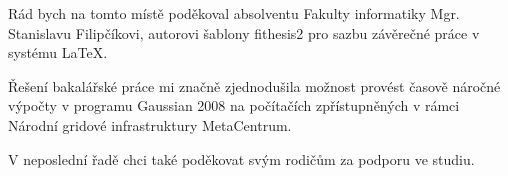 \documentclass[10pt,draft,oneside]{fithesis2}
\begin{document}

\FrontMatter
\ThesisTitlePage

\begin{ThesisDeclaration}
  \DeclarationText
  \AdvisorName
\end{ThesisDeclaration}

\begin{ThesisThanks}
Rád bych na tomto místě poděkoval absolventu Fakulty informatiky Mgr. Stanislavu Filipčíkovi, autorovi šablony fithesis2 pro sazbu závěrečné práce v systému \LaTeX{}.

Řešení bakalářské práce mi značně zjednodušila možnost provést časově náročné výpočty v programu Gaussian 2008 na počítačích zpřístupněných v rámci Národní gridové infrastruktury MetaCentrum.

V neposlední řadě chci také poděkovat svým rodičům za podporu ve studiu.



\end{ThesisThanks}
\end{document}

